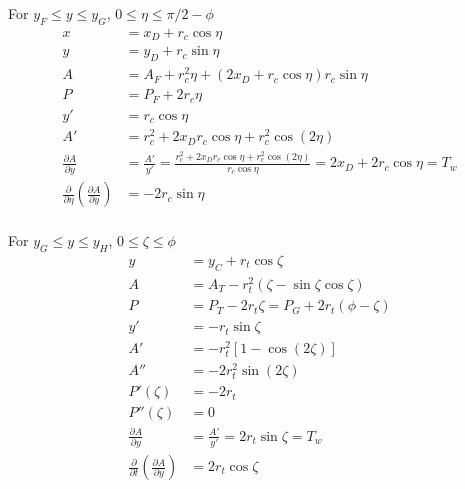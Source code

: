\noindent For $y_F \le y \le y_G$, $0 \le \eta \le  \pi/2-\phi$
\begin{equation}
\begin{aligned}
x & = x_D + r_c \cos\eta \\
y & = y_D + r_c \sin \eta \\
A & = A_F + r_c^2 \eta + (2x_D + r_c\cos\eta)r_c\sin\eta  \\
P & = P_F + 2 r_c \eta \\
y' & = r_c \cos \eta \\
A' & = r_c^2 + 2x_D r_c\cos\eta + r_c^2 \cos(2\eta)  \\
\frac{\partial A}{\partial y} &= \frac{A'}{y'} = \frac{ r_c^2 + 2x_D r_c\cos\eta + r_c^2 \cos(2\eta)}{r_c \cos \eta} =  2x_D + 2r_c\cos\eta = T_w \\
\frac{\partial}{\partial \eta}\left( \frac{\partial A}{\partial y}\right) & = - 2 r_c \sin \eta \\
\end{aligned}
\end{equation}

\noindent For $y_G \le y \le y_H$, $0 \le \zeta \le \phi$
\begin{equation}
\begin{aligned}
y & = y_C + r_t \cos \zeta \\
A & = A_T - r_t^2(\zeta - \sin \zeta \cos \zeta) \\
P & = P_T - 2 r_t \zeta = P_G + 2 r_t (\phi - \zeta) \\
y' & = -r_t \sin \zeta \\
A' &= - r_t^2[1 - \cos(2\zeta)] \\
A'' &= -2  r_t^2 \sin(2\zeta) \\
P'(\zeta) & = -2 r_t \\
P''(\zeta) & = 0 \\
\frac{\partial A}{\partial y} &= \frac{A'}{y'} = 2 r_t \sin \zeta = T_w\\
\frac{\partial}{\partial t}\left( \frac{\partial A}{\partial y}\right) &=  2 r_t \cos \zeta\\
\end{aligned}
\end{equation}


